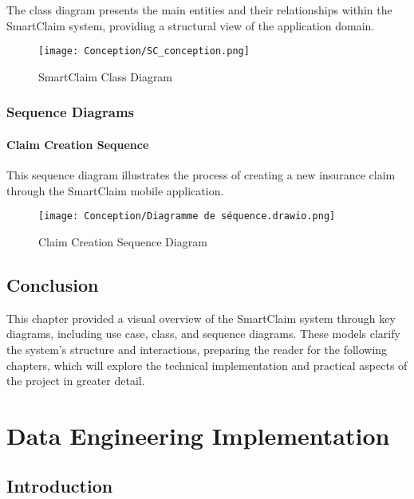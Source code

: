 \documentclass[12pt,a4paper]{report}
\begin{document}
The class diagram presents the main entities and their relationships within the SmartClaim system, providing a structural view of the application domain.

\begin{figure}[H]
    \centering
    \texttt{[image: Conception/SC\_conception.png]}
    \caption{SmartClaim Class Diagram}
    \label{fig:class_diagram}
\end{figure}

\subsection{Sequence Diagrams}

\subsubsection{Claim Creation Sequence}

This sequence diagram illustrates the process of creating a new insurance claim through the SmartClaim mobile application.

\begin{figure}[H]
    \centering
    \texttt{[image: Conception/Diagramme de séquence.drawio.png]}
    \caption{Claim Creation Sequence Diagram}
    \label{fig:sequence_claim_creation}
\end{figure}



\section*{Conclusion}
This chapter provided a visual overview of the SmartClaim system through key diagrams, including use case, class, and sequence diagrams. These models clarify the system's structure and interactions, preparing the reader for the following chapters, which will explore the technical implementation and practical aspects of the project in greater detail.

\chapter{Data Engineering Implementation}

\section{Introduction}
\end{document}
